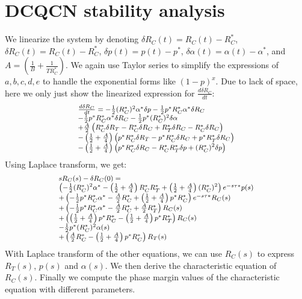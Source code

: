 \appendix
\section{DCQCN stability analysis}
\label{sec:dcqcn_stability_analysis}

We linearize the system by denoting $\delta {R_C}(t) = {R_C}(t) - R_C^*$,
$\delta {R_C}(t) = {R_C}(t) - R_C^*$, $\delta p(t) = p(t) - p^*$, $\delta \alpha
(t) = \alpha (t) - \alpha^*$, and $A = \left( {\frac{1}{B} + \frac{1}{{TR_C^*}}}
\right)$.  We again use Taylor series to simplify the expressions of $a, b, c,
d, e$ to handle the exponential forms like $(1-p)^x$.  Due to lack of space,
here we only just show the linearized expression for $\frac{{d\delta {R_C}}}{{dt}}$:
\begin{equation}
\small
\begin{array}{l}
\frac{{d\delta {R_C}}}{{dt}} =  - \frac{1}{2}{(R_C^*)^2}{\alpha ^*}\delta p - \frac{1}{2}{p^*}R_C^*{\alpha ^*}\delta R_C \\
 - \frac{1}{2}{p^*}R_C^*{\alpha ^*}\delta {R_C} - \frac{1}{2}{p^*}{(R_C^*)^2}\delta \alpha \\
 + \frac{A}{2}\left( {R_C^*\delta {R_T} - R_C^*\delta {R_C} + R_T^*\delta {R_C} - R_C^*\delta R_C} \right)\\
 - \left( {\frac{1}{2} + \frac{A}{4}} \right)\left( {{p^*}R_C^*\delta {R_T} - {p^*}R_C^*\delta {R_C} + {p^*}R_T^*\delta {R_C}} \right)\\ 
 - \left( {\frac{1}{2} + \frac{A}{4}} \right)\left( {{p^*}R_C^*\delta R_C - R_C^*R_T^*\delta p + {{(R_C^*)}^2}\delta p} \right)
\end{array}
\end{equation}
Using Laplace transform, we get:
\begin{equation}
\small
\begin{array}{l}
s{R_C}(s) - \delta {R_C}(0) = \\
\left( { - \frac{1}{2}{{(R_C^*)}^2}{\alpha ^*} - \left( {\frac{1}{2} + \frac{A}{4}} \right)R_C^*R_T^* + \left( {\frac{1}{2} + \frac{A}{4}} \right){{(R_C^*)}^2}} \right){e^{ - s\tau *}}p(s)\\
 + \left( { - \frac{1}{2}{p^*}R_C^*{\alpha ^*} - \frac{A}{2}R_C^* + \left( {\frac{1}{2} + \frac{A}{4}} \right){p^*}R_C^*} \right){e^{ - s\tau *}}{R_C}(s)\\
 + \left( { - \frac{1}{2}{p^*}R_C^*{\alpha ^*} - \frac{A}{2}R_C^* + \frac{A}{2}R_T^* }\right){R_C}(s)\\
 + \left( { \left( {\frac{1}{2} + \frac{A}{4}} \right){p^*}R_C^* - \left( {\frac{1}{2} + \frac{A}{4}} \right){p^*}R_T^*} \right){R_C}(s)\\
 - \frac{1}{2}{p^*}{(R_C^*)^2}\alpha (s)\\
 + \left( {\frac{A}{2}R_C^* - \left( {\frac{1}{2} + \frac{A}{4}} \right){p^*}R_C^*} \right){R_T}(s)
\end{array}
\end{equation}
With Laplace transform of the other equations, we can use ${R_C}(s)$ to express
${R_T}(s)$, $p(s)$ and $\alpha (s)$.  We then derive the characteristic equation
of ${R_C}(s)$. Finally we compute the phase margin values of the characteristic equation
with different parameters.

